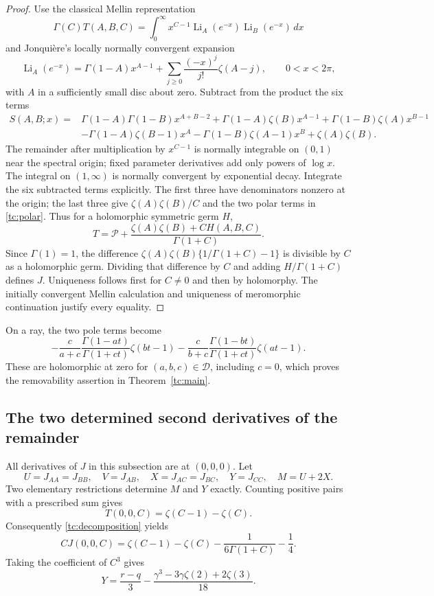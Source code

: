 \begin{proof}
Use the classical Mellin representation
\[
 \Gamma(C)T(A,B,C)
   =\int_0^\infty x^{C-1}
       \operatorname{Li}_A(e^{-x})\operatorname{Li}_B(e^{-x})\,dx
\]
and Jonqui\`ere's locally normally convergent expansion
\[
 \operatorname{Li}_A(e^{-x})
   =\Gamma(1-A)x^{A-1}
     +\sum_{j\ge0}\frac{(-x)^j}{j!}\zeta(A-j),
 \qquad 0<x<2\pi,
\]
with $A$ in a sufficiently small disc about zero.  Subtract from the
product the six terms
\begin{align*}
 S(A,B;x)={}&\Gamma(1-A)\Gamma(1-B)x^{A+B-2}
 +\Gamma(1-A)\zeta(B)x^{A-1}
 +\Gamma(1-B)\zeta(A)x^{B-1}\\
 &-\Gamma(1-A)\zeta(B-1)x^A
 -\Gamma(1-B)\zeta(A-1)x^B+\zeta(A)\zeta(B).
\end{align*}
The remainder after multiplication by $x^{C-1}$ is normally
integrable on $(0,1)$ near the spectral origin; fixed parameter
derivatives add only powers of $\log x$.  The integral on
$(1,\infty)$ is normally convergent by exponential decay.  Integrate
the six subtracted terms explicitly.  The first three have
denominators nonzero at the origin; the last three give
$\zeta(A)\zeta(B)/C$ and the two polar terms in
\eqref{tc:polar}.  Thus for a holomorphic symmetric germ $H$,
\[
 T=\mathscr P+\frac{\zeta(A)\zeta(B)+C H(A,B,C)}{\Gamma(1+C)}.
\]
Since $\Gamma(1)=1$, the difference
$\zeta(A)\zeta(B)\{1/\Gamma(1+C)-1\}$ is divisible by $C$ as a
holomorphic germ.  Dividing that difference by $C$ and adding
$H/\Gamma(1+C)$ defines $J$.  Uniqueness follows first for $C\ne0$
and then by holomorphy.  The initially convergent Mellin calculation
and uniqueness of meromorphic continuation justify every equality.
\end{proof}

On a ray, the two pole terms become
\[
 -\frac{c}{a+c}\frac{\Gamma(1-at)}{\Gamma(1+ct)}\zeta(bt-1)
 -\frac{c}{b+c}\frac{\Gamma(1-bt)}{\Gamma(1+ct)}\zeta(at-1).
\]
These are holomorphic at zero for $(a,b,c)\in\mathscr D$,
including $c=0$, which proves the removability assertion in
Theorem~\ref{tc:main}.

\subsection{The two determined second derivatives of the remainder}

All derivatives of $J$ in this subsection are at $(0,0,0)$.
Let
\[
 U=J_{AA}=J_{BB},\quad V=J_{AB},\quad
 X=J_{AC}=J_{BC},\quad Y=J_{CC},\quad M=U+2X.
\]
Two elementary restrictions determine $M$ and $Y$ exactly.
Counting positive pairs with a prescribed sum gives
\[
 T(0,0,C)=\zeta(C-1)-\zeta(C).
\]
Consequently \eqref{tc:decomposition} yields
\[
 C J(0,0,C)=\zeta(C-1)-\zeta(C)
                   -\frac{1}{6\Gamma(1+C)}-\frac14.
\]
Taking the coefficient of $C^3$ gives
\begin{equation}
 Y=\frac{r-q}{3}
       -\frac{\gamma^3-3\gamma\zeta(2)+2\zeta(3)}{18}.
 \label{tc:Y}
\end{equation}

